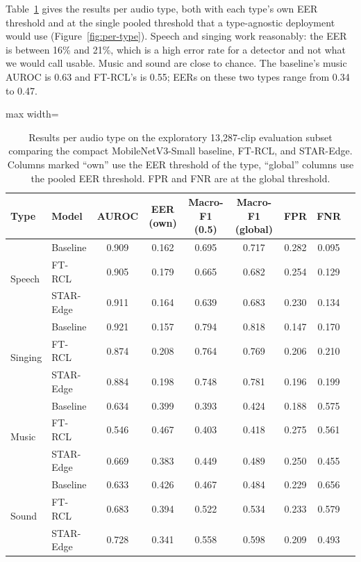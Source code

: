 Table~\ref{tab:type} gives the results per audio type, both with each type's own EER threshold and at the single pooled threshold that a type-agnostic deployment would use (Figure~\ref{fig:per-type}). Speech and singing work reasonably: the EER is between 16\% and 21\%, which is a high error rate for a detector and not what we would call usable. Music and sound are close to chance. The baseline's music AUROC is 0.63 and FT-RCL's is 0.55; EERs on these two types range from 0.34 to 0.47.

\begin{table}[htbp]
\centering
\caption{Results per audio type on the exploratory 13{,}287-clip evaluation subset comparing the compact MobileNetV3-Small baseline, FT-RCL, and STAR-Edge. Columns marked ``own'' use the EER threshold of the type, ``global'' columns use the pooled EER threshold. FPR and FNR are at the global threshold.}
\label{tab:type}
\small
\setlength{\tabcolsep}{3.5pt}
\begin{adjustbox}{max width=\textwidth}
\begin{tabular}{@{}llccccccc@{}}
\toprule
Type & Model & AUROC & EER (own) & Macro-F1 (0.5) & Macro-F1 (global) & FPR & FNR \\
\midrule
\multirow{3}{*}{Speech}  & Baseline & 0.909 & 0.162 & 0.695 & 0.717 & 0.282 & 0.095 \\
 & FT-RCL & 0.905 & 0.179 & 0.665 & 0.682 & 0.254 & 0.129 \\
 & STAR-Edge & 0.911 & 0.164 & 0.639 & 0.683 & 0.230 & 0.134 \\
\midrule
\multirow{3}{*}{Singing} & Baseline & 0.921 & 0.157 & 0.794 & 0.818 & 0.147 & 0.170 \\
 & FT-RCL & 0.874 & 0.208 & 0.764 & 0.769 & 0.206 & 0.210 \\
 & STAR-Edge & 0.884 & 0.198 & 0.748 & 0.781 & 0.196 & 0.199 \\
\midrule
\multirow{3}{*}{Music}   & Baseline & 0.634 & 0.399 & 0.393 & 0.424 & 0.188 & 0.575 \\
 & FT-RCL & 0.546 & 0.467 & 0.403 & 0.418 & 0.275 & 0.561 \\
 & STAR-Edge & 0.669 & 0.383 & 0.449 & 0.489 & 0.250 & 0.455 \\
\midrule
\multirow{3}{*}{Sound}   & Baseline & 0.633 & 0.426 & 0.467 & 0.484 & 0.229 & 0.656 \\
 & FT-RCL & 0.683 & 0.394 & 0.522 & 0.534 & 0.233 & 0.579 \\
 & STAR-Edge & 0.728 & 0.341 & 0.558 & 0.598 & 0.209 & 0.493 \\
\bottomrule
\end{tabular}
\end{adjustbox}
\end{table}

